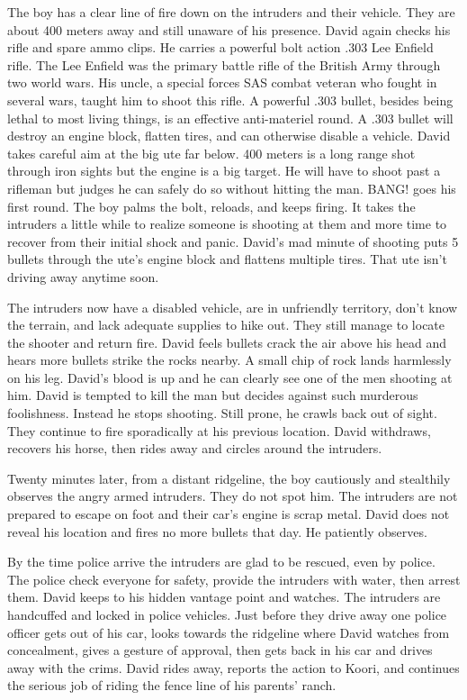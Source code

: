 The boy has a clear line of fire down on the intruders and their vehicle.  They are about 400 meters away and still unaware of his presence.  David again checks his rifle and spare ammo clips.   He carries a powerful bolt action .303 Lee Enfield rifle. The Lee Enfield was the primary battle rifle of the British Army through two world wars. His uncle, a special forces SAS combat veteran who fought in several wars, taught him to shoot this rifle. A powerful .303 bullet, besides being lethal to most living things, is an effective anti-materiel round.  A .303 bullet will destroy an engine block, flatten tires, and can otherwise disable a vehicle. David takes careful aim at the big ute far below.  400 meters is a long range shot through iron sights but the engine is a big target.  He will have to shoot past a rifleman but judges he can safely do so without hitting the man.  BANG! goes his first round.  The boy palms the bolt, reloads, and keeps firing. It takes the intruders a little while to realize someone is shooting at them and more time to recover from their initial shock and panic.  David's mad minute of shooting puts 5 bullets through the ute's engine block and flattens multiple tires.  That ute isn't driving away anytime soon.

The intruders now have a disabled vehicle, are in unfriendly territory, don't know the terrain, and lack adequate supplies to hike out.  They still manage to locate the shooter and return fire.  David feels bullets crack the air above his head and hears more bullets strike the rocks nearby. A small chip of rock lands harmlessly on his leg.  David's blood is up and he can clearly see one of the men shooting at him. David is tempted to kill the man but decides against such murderous foolishness. Instead he stops shooting. Still prone, he crawls back out of sight.  They continue to fire sporadically at his previous location.  David withdraws, recovers his horse, then rides away and circles around the intruders.

Twenty minutes later, from a distant ridgeline, the boy cautiously and stealthily observes the angry armed intruders. They do not spot him. The intruders are not prepared to escape on foot and their car's engine is scrap metal. David does not reveal his location and fires no more bullets that day.  He patiently observes.

By the time police arrive the intruders are glad to be rescued, even by police.   The police check everyone for safety, provide the intruders with water, then arrest them.  David keeps to his hidden vantage point and watches.   The intruders are handcuffed and locked in police vehicles.  Just before they drive away one police officer gets out of his car, looks towards the ridgeline where David watches from concealment, gives a gesture of approval, then gets back in his car and drives away with the crims.  David rides away, reports the action to Koori, and continues the serious job of riding the fence line of his parents' ranch.

